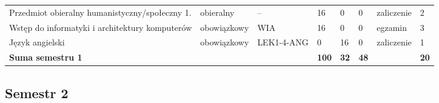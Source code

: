 \documentclass[12pt,a4paper]{article}
\begin{document}
{\begin{longtable}{>{\RaggedRight}m{5.0cm}m{1.9cm}m{0.75cm}m{0.85cm}m{0.85cm}m{0.85cm}m{1.45cm}m{0.9cm}}
\rowcolor{tableElective} Przedmiot obieralny humanistyczny/społeczny 1. & {\scriptsize obieralny} & -- & 16 & 0 & 0 & {\scriptsize zaliczenie} & 2 \\
\rowcolor{tableRowAlt} Wstęp do informatyki i architektury komputerów & {\scriptsize obowiązkowy} & WIA & 16 & 0 & 0 & {\scriptsize egzamin} & 3 \\
\rowcolor{tableRowLight} Język angielski & {\scriptsize obowiązkowy} & LEK1-4-ANG & 0 & 16 & 0 & {\scriptsize zaliczenie} & 1 \\
\midrule[\heavyrulewidth]
\rowcolor{tableSummary} \textbf{Suma semestru 1} & & & \textbf{100} & \textbf{32} & \textbf{48} & & \textbf{20} \\
\bottomrule
\end{longtable}}

\subsection*{Semestr 2}
\end{document}
